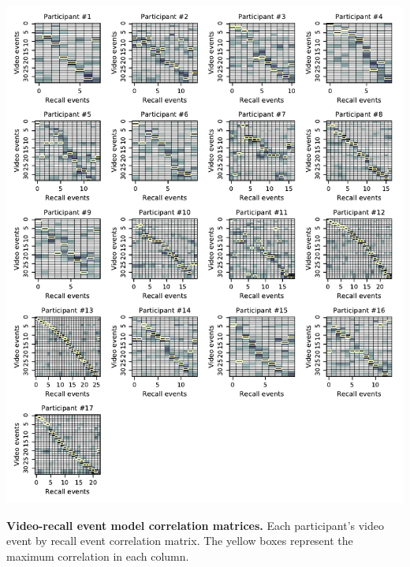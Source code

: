 \documentclass{article}
\begin{document}
\begin{suppfigure}[t!]
\centering
\includegraphics[width=1\textwidth]{figs/supp2_matchmats.pdf}
\caption{\small \textbf{Video-recall event model correlation matrices.} Each participant's video event by recall event correlation matrix.  The yellow boxes represent the maximum correlation in each column.}
\label{fig:matchmats}
\end{suppfigure}
\end{document}
